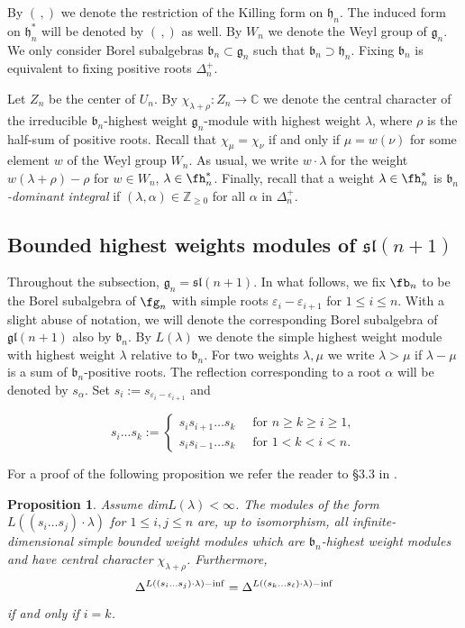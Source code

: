 \documentclass[12pt]{amsart}
\newcommand{\C}{{\mathbb C}}
\def\gb{\mathfrak{b}}
\def\gg{\mathfrak{g}}
\def\gh{\mathfrak{h}}
\def\gh{\mathfrak h}
\newtheorem{prop}[thm]{Proposition}
\begin{document}
By $(\, ,)$ we denote the restriction of the Killing form on $\gh_n$. The induced form on ${\mathfrak h}_n^*$ will be denoted by $(\, ,)$ as well.  By $W_n$ we denote the Weyl group of ${\mathfrak g}_n$.  We only consider Borel subalgebras $\gb_n \subset \gg_n$ such that $\gb_n \supset \gh_n$. Fixing $\gb_n$ is equivalent to fixing positive roots $\Delta_n^+$. 

Let  $Z_n$ be the center of $U_n$.  By $\chi_{\lambda+\rho}: Z_n \to \C$ we
denote the central character of the irreducible $\gb_n$-highest weight
$\gg_n$-module with highest weight $\lambda$, where $\rho$
is the half-sum of positive roots. Recall that
$\chi_{\mu}=\chi_{\nu}$ if and only if $\mu=w(\nu)$ for
some element $w$ of the Weyl group $W_n$.  As usual, we write $w\cdot\lambda$ for the weight $w(\lambda+\rho)-\rho$ for $w\in W_n$, $\lambda\in\fh^*_n$. Finally, recall that a weight $\lambda\in \fh_n^*$ is {\it $\gb_n$-dominant integral} if
$(\lambda,\alpha)\in \mathbb Z_{\geq 0}$ for all $\alpha$ in $\Delta_n^+$.


\subsection{Bounded highest weights modules of $\mathfrak{sl}({n+1})$}
Throughout the subsection, $\gg_n = \mathfrak{sl}({n+1})$. 
In what follows, we fix $\fb_n$ to be the Borel subalgebra of $\fg_n$ with simple roots $\varepsilon_i-\varepsilon_{i+1}$ for  $1\leq i\leq n$. With a slight abuse of notation, we will denote the corresponding Borel subalgebra of $\mathfrak{gl}({n+1})$ also by $\gb_n$. By $L(\lambda)$ we denote the simple highest weight module with highest weight $\lambda$ relative to $\gb_n$. For two weights $\lambda, \mu$ we write $\lambda>\mu$ if $\lambda-\mu$ is a sum of $\gb_n$-positive roots.
 The reflection corresponding to a root $\alpha$ will be denoted by $s_{\alpha}$.  Set $s_i:=s_{\varepsilon_i-\varepsilon_{i+1}}$ and

$$s_i...s_k:=\left\{\begin{array}{ll}
s_is_{i+1}\ldots s_k &\ \text{ for } n\geq k\geq i\geq 1,\\
s_is_{i-1}\ldots s_k & \ \text{ for } 1<k<i<n.
\end{array}
\right.$$

 For a proof of the following proposition we refer the reader to \S 3.3 in \cite{GG}.

\begin{prop} \label{cor-int-bnd}
Assume \emph{dim}$L(\lambda)<\infty$. The modules of the form $L((s_i\dots s_j)\cdot \lambda)$ for $1\leq i,j\leq n$ are, up to isomorphism, all infinite-dimensional simple bounded weight modules which are $\gb_n$-highest weight modules and have central character $\chi_{\lambda + \rho}$. Furthermore,
 $$\Delta^{L((s_i...s_j)  \cdot \lambda) {\rm - inf}} = \Delta^{L((s_k...s_\ell) \cdot \lambda) {\rm - inf}}$$
 if and only if $i = k$.
\end{prop}
\end{document}
